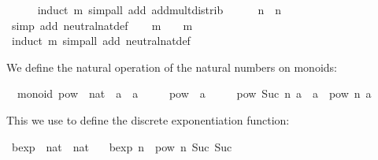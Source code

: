 \begin{isabellebody}
\ \ \ \ \isamarkupfalse%
\ {\isacharparenleft}induct\ m{\isacharparenright}\ {\isacharparenleft}simp{\isacharunderscore}all\ add{\isacharcolon}\ add{\isacharunderscore}mult{\isacharunderscore}distrib{\isacharparenright}\isanewline
\ \ \isamarkupfalse%
\ {\isachardoublequoteopen}{\isasymone}\ {\isasymotimes}\ n\ {\isacharequal}\ n{\isachardoublequoteclose}\isanewline
\ \ \ \ \isamarkupfalse%
\ {\isacharparenleft}simp\ add{\isacharcolon}\ neutral{\isacharunderscore}nat{\isacharunderscore}def{\isacharparenright}\isanewline
\ \ \isamarkupfalse%
\ {\isachardoublequoteopen}m\ {\isasymotimes}\ {\isasymone}\ {\isacharequal}\ m{\isachardoublequoteclose}\isanewline
\ \ \ \ \isamarkupfalse%
\ {\isacharparenleft}induct\ m{\isacharparenright}\ {\isacharparenleft}simp{\isacharunderscore}all\ add{\isacharcolon}\ neutral{\isacharunderscore}nat{\isacharunderscore}def{\isacharparenright}\isanewline
{}\isamarkupfalse%
\isanewline
\isanewline
{}\isamarkupfalse%
%
\endisatagquote
{\isafoldquote}%
%
\isadelimquote
%
\endisadelimquote
%
\begin{isamarkuptext}%
\noindent We define the natural operation of the natural numbers
  on monoids:%
\end{isamarkuptext}%
\isamarkuptrue%
%
\isadelimquote
%
\endisadelimquote
%
\isatagquote
{}\isamarkupfalse%
\ {\isacharparenleft}\ monoid{\isacharparenright}\ pow\ {\isacharcolon}{\isacharcolon}\ {\isachardoublequoteopen}nat\ {\isasymRightarrow}\ {\isacharprime}a\ {\isasymRightarrow}\ {\isacharprime}a{\isachardoublequoteclose}\ \isanewline
\ \ \ \ {\isachardoublequoteopen}pow\ {}\ a\ {\isacharequal}\ {\isasymone}{\isachardoublequoteclose}\isanewline
\ \ {\isacharbar}\ {\isachardoublequoteopen}pow\ {\isacharparenleft}Suc\ n{\isacharparenright}\ a\ {\isacharequal}\ a\ {\isasymotimes}\ pow\ n\ a{\isachardoublequoteclose}%
\endisatagquote
{\isafoldquote}%
%
\isadelimquote
%
\endisadelimquote
%
\begin{isamarkuptext}%
\noindent This we use to define the discrete exponentiation
  function:%
\end{isamarkuptext}%
\isamarkuptrue%
%
\isadelimquote
%
\endisadelimquote
%
\isatagquote
{}\isamarkupfalse%
\ bexp\ {\isacharcolon}{\isacharcolon}\ {\isachardoublequoteopen}nat\ {\isasymRightarrow}\ nat{\isachardoublequoteclose}\ \isanewline
\ \ {\isachardoublequoteopen}bexp\ n\ {\isacharequal}\ pow\ n\ {\isacharparenleft}Suc\ {\isacharparenleft}Suc\ {}{\isacharparenright}{\isacharparenright}{\isachardoublequoteclose}%

\end{isabellebody}
